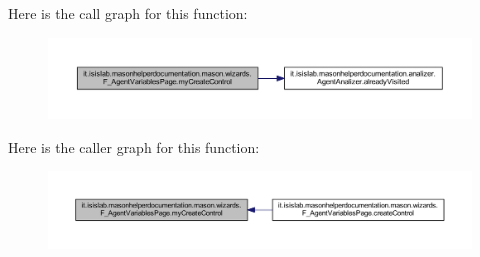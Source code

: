 Here is the call graph for this function\-:\nopagebreak
\begin{figure}[H]
\begin{center}
\leavevmode
\includegraphics[width=350pt]{classit_1_1isislab_1_1masonhelperdocumentation_1_1mason_1_1wizards_1_1_f___agent_variables_page_a182a280459538ed143e8cd15904dd7c3_cgraph}
\end{center}
\end{figure}




Here is the caller graph for this function\-:\nopagebreak
\begin{figure}[H]
\begin{center}
\leavevmode
\includegraphics[width=350pt]{classit_1_1isislab_1_1masonhelperdocumentation_1_1mason_1_1wizards_1_1_f___agent_variables_page_a182a280459538ed143e8cd15904dd7c3_icgraph}
\end{center}
\end{figure}




